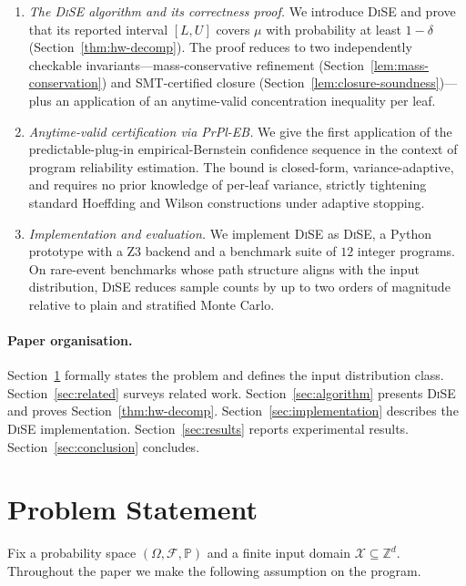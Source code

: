 \documentclass[runningheads]{llncs}
\providecommand{\Cref}[1]{Section~\ref{#1}}
\newcommand{\inX}{\mathcal{X}}
\newcommand{\mutrue}{\mu}
\newcommand{\toolname}{\textsc{DiSE}}
\begin{document}
\begin{enumerate}
\item \emph{The \toolname{} algorithm and its correctness proof.}  We
  introduce \toolname{} and prove that its reported interval $[L,U]$
  covers $\mutrue$ with probability at least $1-\delta$
  (\Cref{thm:hw-decomp}).  The proof reduces to two independently
  checkable invariants---mass-conservative refinement
  (\Cref{lem:mass-conservation}) and SMT-certified closure
  (\Cref{lem:closure-soundness})---plus an application of an
  anytime-valid concentration inequality per leaf.

\item \emph{Anytime-valid certification via PrPl-EB.}  We give the
  first application of the predictable-plug-in empirical-Bernstein
  confidence sequence in the context of program reliability
  estimation.  The bound is closed-form, variance-adaptive, and
  requires no prior knowledge of per-leaf variance, strictly
  tightening standard Hoeffding and Wilson constructions under
  adaptive stopping.

\item \emph{Implementation and evaluation.}  We implement \toolname{}
  as \toolname{}, a Python prototype with a Z3 backend and a benchmark
  suite of $12$ integer programs.  On rare-event benchmarks whose path
  structure aligns with the input distribution, \toolname{} reduces
  sample counts by up to two orders of magnitude relative to plain and
  stratified Monte Carlo.
\end{enumerate}

\paragraph{Paper organisation.}
\Cref{sec:problem} formally states the problem and defines the input
distribution class.  \Cref{sec:related} surveys related work.
\Cref{sec:algorithm} presents \toolname{} and proves
\Cref{thm:hw-decomp}.  \Cref{sec:implementation} describes the
\toolname{} implementation.  \Cref{sec:results} reports experimental
results.  \Cref{sec:conclusion} concludes.

\section{Problem Statement}\label{sec:problem}

Fix a probability space $(\Omega, \mathcal{F}, \mathbb{P})$ and a
finite input domain $\inX \subseteq \mathbb{Z}^d$.  Throughout the
paper we make the following assumption on the program.
\end{document}
